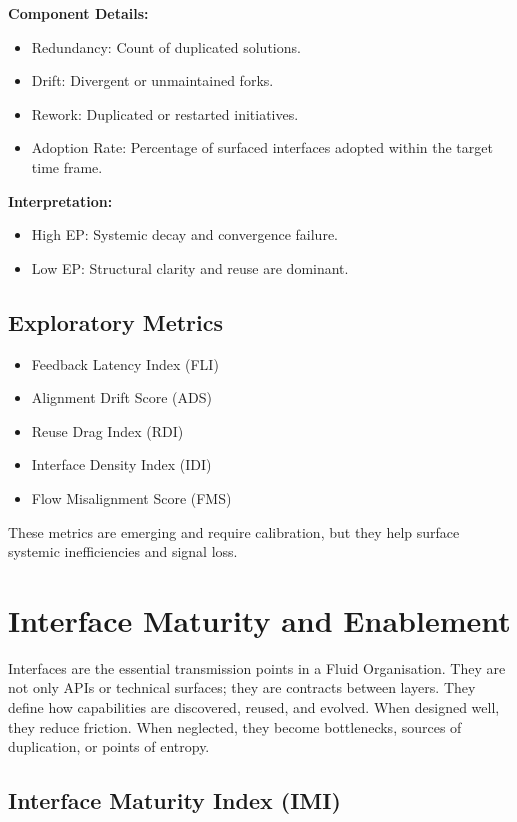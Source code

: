 \documentclass[12pt]{article}
\begin{document}
\textbf{Component Details:}
\begin{itemize}
    \item Redundancy: Count of duplicated solutions.
    \item Drift: Divergent or unmaintained forks.
    \item Rework: Duplicated or restarted initiatives.
    \item Adoption Rate: Percentage of surfaced interfaces adopted within the target time frame.
\end{itemize}

\textbf{Interpretation:}
\begin{itemize}
    \item High EP: Systemic decay and convergence failure.
    \item Low EP: Structural clarity and reuse are dominant.
\end{itemize}

\subsection{Exploratory Metrics}
\begin{itemize}
    \item Feedback Latency Index (FLI)
    \item Alignment Drift Score (ADS)
    \item Reuse Drag Index (RDI)
    \item Interface Density Index (IDI)
    \item Flow Misalignment Score (FMS)
\end{itemize}

These metrics are emerging and require calibration, but they help surface systemic inefficiencies and signal loss.

\section{Interface Maturity and Enablement}

Interfaces are the essential transmission points in a Fluid Organisation. They are not only APIs or technical surfaces; they are contracts between layers. They define how capabilities are discovered, reused, and evolved. When designed well, they reduce friction. When neglected, they become bottlenecks, sources of duplication, or points of entropy.

\subsection*{Interface Maturity Index (IMI)}
\end{document}
